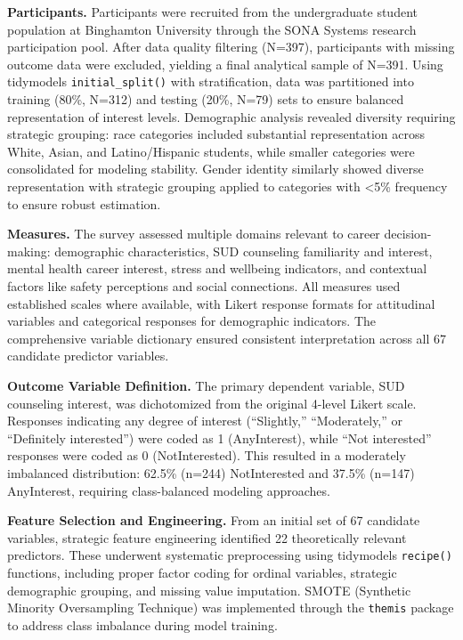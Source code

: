 \documentclass[
  man,
  longtable,
  nolmodern,
  notxfonts,
  notimes,
  colorlinks=true,linkcolor=blue,citecolor=blue,urlcolor=blue]{apa7}
\begin{document}
\textbf{Participants.} Participants were recruited from the
undergraduate student population at Binghamton University through the
SONA Systems research participation pool. After data quality filtering
(N=397), participants with missing outcome data were excluded, yielding
a final analytical sample of N=391. Using tidymodels
\texttt{initial\_split()} with stratification, data was partitioned into
training (80\%, N=312) and testing (20\%, N=79) sets to ensure balanced
representation of interest levels. Demographic analysis revealed
diversity requiring strategic grouping: race categories included
substantial representation across White, Asian, and Latino/Hispanic
students, while smaller categories were consolidated for modeling
stability. Gender identity similarly showed diverse representation with
strategic grouping applied to categories with \textless5\% frequency to
ensure robust estimation.

\textbf{Measures.} The survey assessed multiple domains relevant to
career decision-making: demographic characteristics, SUD counseling
familiarity and interest, mental health career interest, stress and
wellbeing indicators, and contextual factors like safety perceptions and
social connections. All measures used established scales where
available, with Likert response formats for attitudinal variables and
categorical responses for demographic indicators. The comprehensive
variable dictionary ensured consistent interpretation across all 67
candidate predictor variables.

\textbf{Outcome Variable Definition.} The primary dependent variable,
SUD counseling interest, was dichotomized from the original 4-level
Likert scale. Responses indicating any degree of interest (``Slightly,''
``Moderately,'' or ``Definitely interested'') were coded as 1
(AnyInterest), while ``Not interested'' responses were coded as 0
(NotInterested). This resulted in a moderately imbalanced distribution:
62.5\% (n=244) NotInterested and 37.5\% (n=147) AnyInterest, requiring
class-balanced modeling approaches.

\textbf{Feature Selection and Engineering.} From an initial set of 67
candidate variables, strategic feature engineering identified 22
theoretically relevant predictors. These underwent systematic
preprocessing using tidymodels \texttt{recipe()} functions, including
proper factor coding for ordinal variables, strategic demographic
grouping, and missing value imputation. SMOTE (Synthetic Minority
Oversampling Technique) was implemented through the \texttt{themis}
package to address class imbalance during model training.
\end{document}

